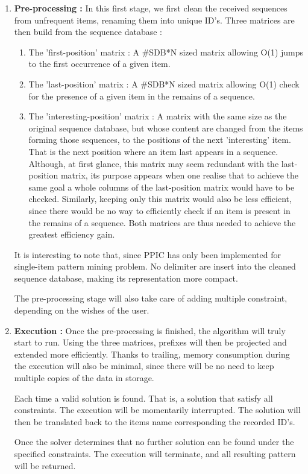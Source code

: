 \documentclass{eplmastersthesis}
\begin{document}
\begin{enumerate}
\item \textbf{Pre-processing :} In this first stage, we first clean the received sequences from unfrequent items, renaming them into unique ID's. Three matrices are then build from the sequence database :
	\begin{enumerate}
		\item The 'first-position' matrix : A \#SDB*N sized matrix allowing O(1) jumps to the first occurrence of a given item. 
		\item The 'last-position' matrix : A  \#SDB*N sized matrix allowing O(1) check for the presence of a given item in the remains of a sequence.
		\item The 'interesting-position' matrix : A matrix with the same size as the original sequence database, but whose content are changed from the items forming those sequences, to the positions of the next 'interesting' item. That is the next position where an item last appears in a sequence. \\ Although, at first glance, this matrix may seem redundant with the last-position matrix, its purpose appears when one realise that to achieve the same goal a whole columns of the last-position matrix would have to be checked. Similarly, keeping only this matrix would also be less efficient, since there would be no way to efficiently check if an item is present in the remains of a sequence. Both matrices are thus needed to achieve the greatest efficiency gain. 
	\end{enumerate}
	It is interesting to note that, since PPIC has only been implemented for single-item pattern mining problem. No delimiter are insert into the cleaned sequence database, making its representation more compact. \newline
	
	The pre-processing stage will also take care of adding multiple constraint, depending on the wishes of the user. 
\item \textbf{Execution :} Once the pre-processing is finished, the algorithm will truly start to run. Using the three matrices, prefixes will then be projected and extended more efficiently. Thanks to trailing, memory consumption during the execution will also be minimal, since there will be no need to keep multiple copies of the data in storage. \newline

Each time a valid solution is found. That is, a solution that satisfy all constraints. The execution will be momentarily interrupted. The solution will then be translated back to the items name corresponding the recorded ID's. \newline

Once the solver determines that no further solution can be found under the specified constraints. The execution will terminate, and all resulting pattern will be returned.
\end{enumerate}
\end{document}

